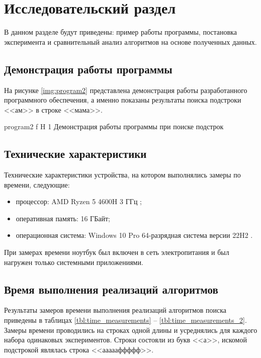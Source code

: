 \chapter{Исследовательский раздел}

В данном разделе будут приведены: пример работы программы, постановка эксперимента и сравнительный анализ алгоритмов на основе полученных данных.

\section{Демонстрация работы программы}


На рисунке \ref{img:program2} представлена демонстрация работы разработанного программного обеспечения, а именно показаны результаты поиска подстроки <<ам>> в строке <<мама>>.  


{program2} %
{f} %
{H} %
{1\textwidth} %
{Демонстрация работы программы при поиске подстрок} %



\section{Технические характеристики}

Технические характеристики устройства, на котором выполнялись замеры по времени, следующие:
\begin{itemize}
	\item процессор: AMD Ryzen 5 4600H 3 ГГц \cite{amd};
	\item оперативная память: 16 ГБайт;
	\item операционная система: Windows 10 Pro 64-разрядная система версии 22H2 \cite{windows}.
\end{itemize}

При замерах времени ноутбук был включен в сеть электропитания и был нагружен только системными приложениями.

\section{Время выполнения реализаций алгоритмов}

Результаты замеров времени выполнения реализаций алгоритмов поиска приведены в таблицах \ref{tbl:time_measurements} -- \ref{tbl:time_measurements_2}.
Замеры времени проводились на строках одной длины и усреднялись для каждого набора одинаковых экспериментов. Строки состояли из букв <<а>>, искомой подстрокой являлась строка <<аааааффффф>>.

